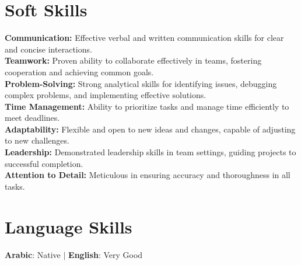 \documentclass[letterpaper,11pt]{article}
\begin{document}
\section{Soft Skills}
\begin{itemize}[leftmargin=0.15in, label={}]
    \small{
        \item{
            \textbf{Communication:} Effective verbal and written communication skills for clear and concise interactions. \\
            \textbf{Teamwork:} Proven ability to collaborate effectively in teams, fostering cooperation and achieving common goals. \\
            \textbf{Problem-Solving:} Strong analytical skills for identifying issues, debugging complex problems, and implementing effective solutions. \\
            \textbf{Time Management:} Ability to prioritize tasks and manage time efficiently to meet deadlines. \\
            \textbf{Adaptability:} Flexible and open to new ideas and changes, capable of adjusting to new challenges. \\
            \textbf{Leadership:} Demonstrated leadership skills in team settings, guiding projects to successful completion. \\
            \textbf{Attention to Detail:} Meticulous in ensuring accuracy and thoroughness in all tasks. \\
        }
    }
\end{itemize}


\vspace{-16pt}


\section{Language Skills}
\begin{itemize}[leftmargin=0.15in, label={}]
    \small{
        \item{
            \textbf{Arabic}{: Native} \quad $|$ \quad \textbf{English}{: Very Good}
        }
    }
\end{itemize}
\end{document}
